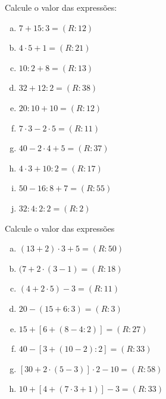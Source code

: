 \item Calcule o valor das expressões:
	\begin{multicols}{2}
	\begin{enumerate}[a)]
		\item $7+15:3                    = (R:12)$
		\item $4\cdot5+1                     = (R:21)$
		\item $10:2+8                    = (R:13)$
		\item $32+12:2                  = (R:38)$
		\item $20:10+10                = (R:12)$
		\item $7\cdot3-2\cdot5                   = (R:11)$
		\item $40-2\cdot4+5                 = (R:37)$
		\item $4\cdot3+10:2                 = (R:17)$
		\item $50-16:8+7                 = (R:55)$
		\item $32:4:2:2                    = (R:2)$
	\end{enumerate}
	\end{multicols}

\item Calcule o valor das expressões
	\begin{multicols}{2}
	\begin{enumerate}[a)]
		\item $(13+2)\cdot3+5            = (R:50)$
		\item $(7+2\cdot(3-1)              = (R:18)$
		\item $(4+2\cdot5)-3                = (R:11)$
		\item $20-(15+6:3)                        = (R:3)$
		\item $15+[6+(8-4:2)]                    = (R:27)$
		\item $40-[3+(10-2):2]                    = (R:33)$
		\item $[30+2\cdot(5-3)]\cdot2-10              = (R:58)$
		\item $10+[4+(7\cdot3+1)]-3              = (R:33)$
	\end{enumerate}
	\end{multicols}


